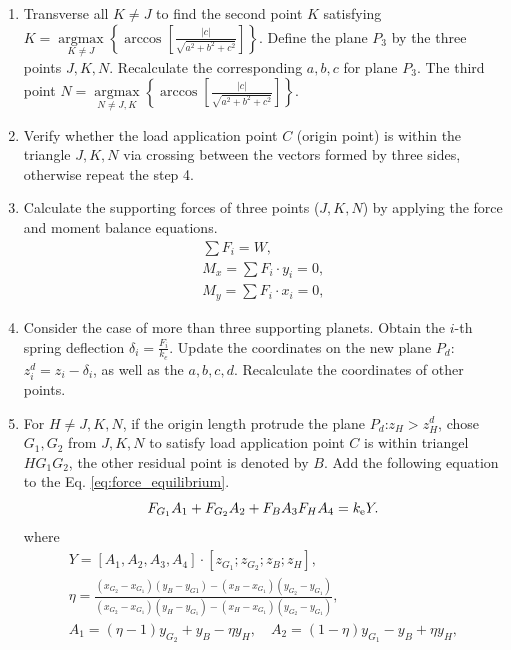 \documentclass[a4paper,fleqn]{cas-sc}%
\begin{document}
\begin{enumerate}
    \item Transverse all $K\neq J$ to find the second point $K$ satisfying $K=\mathop{\arg\max}\limits_{K \neq J}\left\{\arccos\left[\frac{|c|}{\sqrt{a^2+b^2+c^2}}\right]\right\}$. Define the plane  $P_3$  by the three points $J, K, N$. Recalculate the corresponding $a, b,c$ for plane $P_3$. The third point $N=\mathop{\arg\max}\limits_{N \neq J,K}\left\{\arccos\left[\frac{|c|}{\sqrt{a^2+b^2+c^2}}\right]\right\}$.
    \item Verify whether the load  application point $C$ (origin point) is within the triangle $J,K,N$ via crossing between the vectors formed by three sides, otherwise repeat the step 4.
    \item Calculate the supporting forces of three points ($J,K,N$) by applying the force and moment balance equations.
    \begin{equation}
        \begin{split}
        \sum F_i=W,\\
        M_x=\sum F_i\cdot y_i=0,\\
        M_y=\sum F_i\cdot x_i=0, \label{eq:force_equilibrium}
        \end{split}
    \end{equation}
    \item Consider the case of more than three supporting planets. Obtain the $i$-th spring deflection $\delta_i=\frac{F_i}{k_e}$. Update the coordinates on the new plane $P_d$: $z^d_i=z_i-\delta_i$, as well as the $a,b,c,d$. Recalculate the coordinates of other points.
    \item For $H\neq J,K,N$, if the origin length protrude the plane $P_d$:$z_H>z^d_H$, chose $G_1,G_2$ from $J,K,N$ to satisfy load application point $C$ is within triangel $HG_1G_2$, the other residual point is denoted by $B$. Add the following equation to the Eq. \ref{eq:force_equilibrium}.
    \begin{equation}
        F_{G_1}A_1+F_{G_2}A_2+F_B A_3 F_H A_4=k_{\rm e}Y.
    \end{equation}
    where
    \begin{equation}
        \begin{split}
            Y=[A_1,A_2,A_3,A_4] \cdot [z_{G_1};z_{G_2};z_B;z_H],\\
            \eta=\frac{(x_{G_2}-x_{G_1})(y_B-y_{G1})-(x_B-x_{G_1})(y_{G_2}-y_{G_1})}{(x_{G_2}-x_{G_1})(y_H-y_{G_1})-(x_H-x_{G_1})(y_{G_2}-y_{G_1})},\\
            A_1=(\eta-1)y_{G_2}+y_B-\eta y_H,\quad A_2=(1-\eta)y_{G_1}-y_B+\eta y_H,\\

\end{split}
\end{equation}
\end{enumerate}
\end{document}
